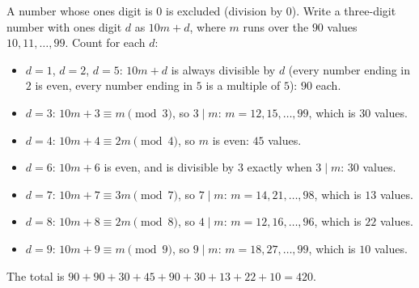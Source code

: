 A number whose ones digit is $0$ is excluded (division by $0$). Write a three-digit number with ones digit $d$ as $10m+d$, where $m$ runs over the $90$ values $10,11,\dots,99$. Count for each $d$:
\begin{itemize}
\item $d=1$, $d=2$, $d=5$: $10m+d$ is always divisible by $d$ (every number ending in $2$ is even, every number ending in $5$ is a multiple of $5$): $90$ each.
\item $d=3$: $10m+3\equiv m\pmod3$, so $3\mid m$: $m=12,15,\dots,99$, which is $30$ values.
\item $d=4$: $10m+4\equiv2m\pmod4$, so $m$ is even: $45$ values.
\item $d=6$: $10m+6$ is even, and is divisible by $3$ exactly when $3\mid m$: $30$ values.
\item $d=7$: $10m+7\equiv3m\pmod7$, so $7\mid m$: $m=14,21,\dots,98$, which is $13$ values.
\item $d=8$: $10m+8\equiv2m\pmod8$, so $4\mid m$: $m=12,16,\dots,96$, which is $22$ values.
\item $d=9$: $10m+9\equiv m\pmod9$, so $9\mid m$: $m=18,27,\dots,99$, which is $10$ values.
\end{itemize}
The total is $90+90+30+45+90+30+13+22+10=\boxed{420}$.
